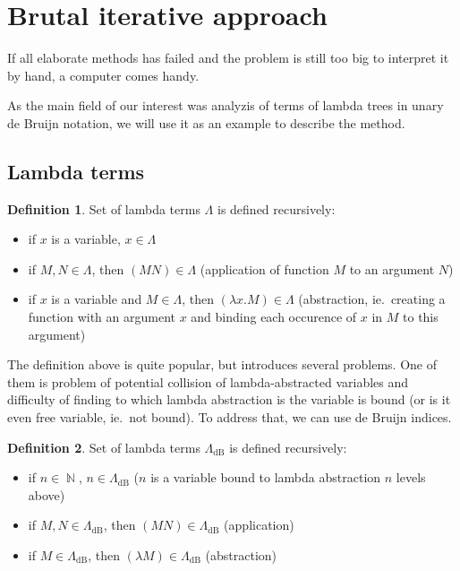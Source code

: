 \documentclass[final]{article}
\theoremstyle{definition}
\newtheorem{definition}{Definition}[subsection]
\theoremstyle{remark}
\newcommand{\LambdadB}{\ensuremath{\Lambda_{\text{dB}}}}
\DeclareMathOperator{\N}{\mathbb{N}}
\begin{document}
\section{Brutal iterative approach}%
\label{sec:brutal_iterative_approach}

If all elaborate methods has failed and the problem is still too big to interpret it by hand, a computer comes handy.

As the main field of our interest was analyzis of terms of lambda trees in unary de Bruijn notation, we will use it as an example to describe the method.

\subsection{Lambda terms}%
\label{sub:lambda_terms}

\begin{definition}
    Set of lambda terms \(\Lambda\) is defined recursively:
    \begin{itemize}
        \item if \(x\) is a variable, \(x \in \Lambda\)
        \item if \(M, N \in \Lambda\), then \((M N) \in \Lambda\) (application of function \(M\) to an argument \(N\))
        \item if \(x\) is a variable and \(M \in \Lambda\), then \((\lambda x . M) \in \Lambda\) (abstraction, ie.\ creating a function with an argument \(x\) and binding each occurence of \(x\) in \(M\) to this argument)
    \end{itemize}
\end{definition}

The definition above is quite popular, but introduces several problems. One of them is problem of potential collision of lambda-abstracted variables and difficulty of finding to which lambda abstraction is the variable is bound (or is it even free variable, ie.\ not bound). To address that, we can use de Bruijn indices.

\begin{definition}
    Set of lambda terms \(\LambdadB\) is defined recursively:
    \begin{itemize}
        \item if \(n \in \N\), \(n \in \LambdadB\) (\(n\) is a variable bound to lambda abstraction \(n\) levels above)
        \item if \(M, N \in \LambdadB\), then \((M N) \in \LambdadB\) (application)
        \item if \(M \in \LambdadB\), then \((\lambda M) \in \LambdadB\) (abstraction)
    \end{itemize}
\end{definition}
\end{document}
